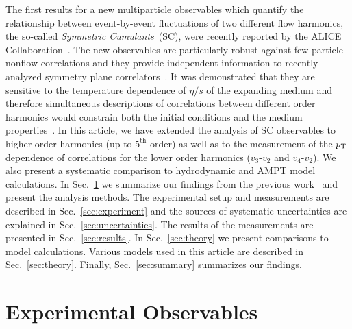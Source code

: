 The first results for a new multiparticle observables which quantify the relationship between event-by-event fluctuations of two different flow harmonics, the so-called \textit{Symmetric Cumulants}~(SC), were recently reported by the ALICE Collaboration~\cite{ALICE:2016kpq}.
The new observables are particularly robust against few-particle nonflow correlations and they provide independent information to recently analyzed symmetry plane correlators~\cite{Aad:2014fla}. 
It was demonstrated that they are sensitive to the temperature dependence of $\eta/s$ of the expanding medium and therefore simultaneous descriptions of correlations between different order harmonics would constrain both the initial conditions and the medium properties~\cite{ALICE:2016kpq,Zhu:2016puf}.
In this article, we have extended the analysis of SC observables to higher order harmonics (up to $5^{\mathrm{th}}$ order) as well as to the measurement of the $p_{\rm T}$ dependence of correlations for the lower order harmonics ($v_3$-$v_2$ and $v_4$-$v_2$).  We also present a systematic comparison to hydrodynamic and AMPT model calculations.
In Sec.~\ref{sec:method} we summarize our findings from the previous work~\cite{ALICE:2016kpq} and present the analysis methods. The experimental setup and measurements are described in Sec.~\ref{sec:experiment} and the sources of systematic uncertainties are explained in Sec.~\ref{sec:uncertainties}. The results of the measurements are presented in Sec.~\ref{sec:results}. 
 In Sec.~\ref{sec:theory} we present comparisons to model calculations. Various models used in this article are described in Sec.~\ref{sec:theory}. Finally, Sec.~\ref{sec:summary} summarizes our findings.
 
\section{Experimental Observables}
\label{sec:method}

